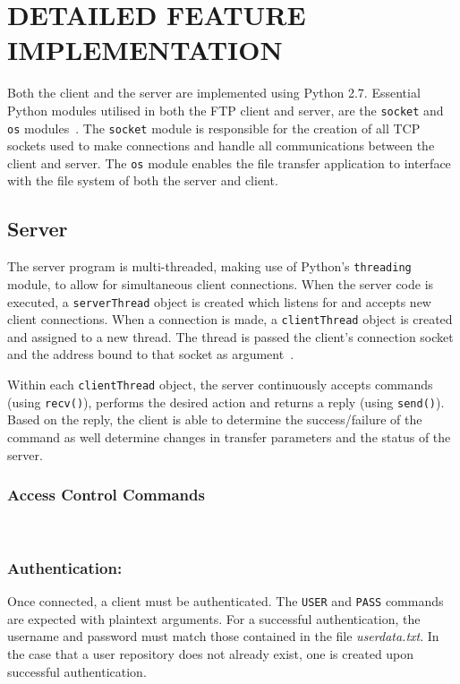 \documentclass[10pt,twocolumn]{witseiepaper}
\begin{document}
\section{DETAILED FEATURE IMPLEMENTATION} %

Both the client and the server are implemented using Python 2.7. Essential Python modules utilised in both the FTP client and server, are the \texttt{socket} and \texttt{os} modules~\cite{osModule,socketModule}. The \texttt{socket} module is responsible for the creation of all TCP sockets used to make connections and handle all communications between the client and server. The \texttt{os} module enables the file transfer application to interface with the file system of both the server and client.

\vspace*{-2mm}
\subsection{Server}

 The server program is multi-threaded, making use of Python's \texttt{threading} module, to allow for simultaneous client connections. When the server code is executed, a \texttt{serverThread} object is created which listens for and accepts new client connections. When a connection is made, a \texttt{clientThread} object is created and assigned to a new thread. The thread is passed the client's connection socket and the address bound to that socket as argument~\cite{socketModule}.
 
 Within each \texttt{clientThread} object, the server continuously accepts commands (using \texttt{recv()}), performs the desired action and returns a reply (using \texttt{send()}). Based on the reply, the client is able to determine the success/failure of the command as well determine changes in transfer parameters and the status of the server.
 
\vspace*{-2mm}
\subsubsection{Access Control Commands} $   $

\subsubsection*{Authentication:} \vspace*{-\baselineskip}
Once connected, a client must be authenticated. The \texttt{USER} and \texttt{PASS} commands are expected with plaintext arguments. For a successful authentication, the username and password must match those contained in the file \textit{userdata.txt}. In the case that a user repository does not already exist, one is created upon successful authentication.
\end{document}
